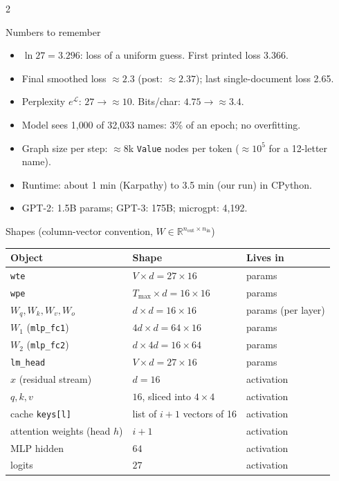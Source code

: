 \documentclass[10pt,letterpaper]{article}
\newcommand{\code}[1]{\lstinline[basicstyle=\ttfamily\small]|#1|}
\newcommand{\R}{\mathbb{R}}
\newcounter{q}
\begin{document}
\begin{multicols}{2}
\begin{cs}{Numbers to remember}
\begin{itemize}
  \item $\ln 27 = 3.296$: loss of a uniform guess. First printed loss 3.366.
  \item Final smoothed loss $\approx 2.3$ (post: $\approx 2.37$); last single-document loss 2.65.
  \item Perplexity $e^{\mathcal L}$: $27\to\approx 10$. Bits/char: $4.75\to\approx 3.4$.
  \item Model sees 1{,}000 of 32{,}033 names: 3\% of an epoch; no overfitting.
  \item Graph size per step: $\approx 8$k \code{Value} nodes per token ($\approx 10^5$ for a 12-letter name).
  \item Runtime: about 1 min (Karpathy) to 3.5 min (our run) in CPython.
  \item GPT-2: 1.5B params; GPT-3: 175B; microgpt: 4{,}192.
\end{itemize}
\end{cs}

\columnbreak

\begin{csb}{Shapes (column-vector convention, $W\in\R^{n_{\text{out}}\times n_{\text{in}}}$)}
\begin{tabular}{@{}lll@{}}
\toprule
Object & Shape & Lives in \\
\midrule
\code{wte} & $V\times d = 27\times 16$ & params \\
\code{wpe} & $T_{\max}\times d = 16\times 16$ & params \\
$W_q,W_k,W_v,W_o$ & $d\times d = 16\times 16$ & params (per layer) \\
$W_1$ (\code{mlp_fc1}) & $4d\times d = 64\times 16$ & params \\
$W_2$ (\code{mlp_fc2}) & $d\times 4d = 16\times 64$ & params \\
\code{lm_head} & $V\times d = 27\times 16$ & params \\
$x$ (residual stream) & $d=16$ & activation \\
$q,k,v$ & $16$, sliced into $4\times 4$ & activation \\
cache \code{keys[l]} & list of $i{+}1$ vectors of 16 & activation \\
attention weights (head $h$) & $i{+}1$ & activation \\
MLP hidden & $64$ & activation \\
logits & $27$ & activation \\
\bottomrule
\end{tabular}
\end{csb}


\end{multicols}
\end{document}

